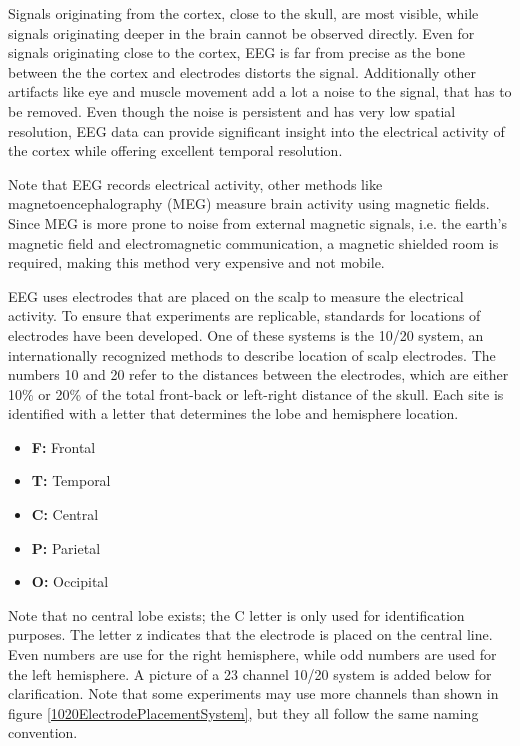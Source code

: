 \npar

Signals originating from the cortex, close to the skull, are most visible, while signals originating deeper in the brain cannot be observed directly. Even for signals originating close to the cortex, EEG is far from precise as the bone between the the cortex and electrodes distorts the signal. Additionally other artifacts like eye and muscle movement add a lot a noise to the signal, that has to be removed. Even though the noise is persistent and has very low spatial resolution, EEG data can provide significant insight into the electrical activity of the cortex while offering excellent temporal resolution\cite{GivenPaper}.

\npar

Note that EEG records electrical activity, other methods like magnetoencephalography (MEG) measure brain activity using magnetic fields. Since MEG is more prone to noise from external magnetic signals, i.e. the earth's magnetic field and electromagnetic communication, a magnetic shielded room is required, making this method very expensive and not mobile. 

EEG uses electrodes that are placed on the scalp to measure the electrical activity. To ensure that experiments are replicable, standards for locations of electrodes have been developed. One of these systems is the 10/20 system, an internationally recognized methods to describe location of scalp electrodes\cite{TenTwentyManual}. The numbers 10 and 20 refer to the distances between the electrodes, which are either 10\% or 20\% of the total front-back or left-right distance of the skull. Each site is identified with a letter that determines the lobe and hemisphere location.
\begin{itemize}
\item \textbf{F:} Frontal
\item \textbf{T:} Temporal
\item \textbf{C:} Central
\item \textbf{P:} Parietal
\item \textbf{O:} Occipital
\end{itemize}
Note that no central lobe exists; the C letter is only used for identification purposes. The letter z indicates that the electrode is placed on the central line. Even numbers are use for the right hemisphere, while odd numbers are used for the left hemisphere. A picture of a 23 channel 10/20 system is added below for clarification. Note that some experiments may use more channels than shown in figure \ref{1020ElectrodePlacementSystem}, but they all follow the same naming convention.

